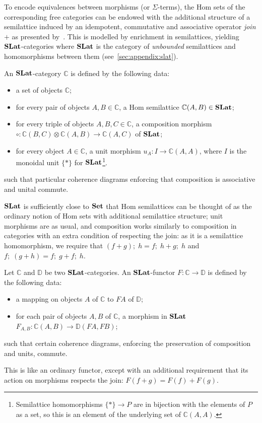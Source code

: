 To encode equivalences between morphisms (or $\Sigma$-terms), the Hom sets of the corresponding free categories can be endowed with the additional structure of a semilattice induced by an idempotent, commutative and associative operator \textit{join} $+$ as presented by~\citet{tiurin2025equivalencehypergraphsdporewriting}.
This is modelled by enrichment in semilattices, yielding $\mathbf{SLat}$-categories where $\mathbf{SLat}$ is the category of \textit{unbounded} semilattices and homomorphisms between them (see~\autoref{sec:appendix:slat}).

\begin{defi}%
	\label{def:slat-cat}
	An $\mathbf{SLat}$-category $\mathbb{C}$ is defined by the following data:
	\begin{itemize}
		\item a set of objects $\mathbb{C}$;
		\item for every pair of objects $A,B \in \mathbb{C}$, a Hom semilattice $\mathbb{C}(A,B) \in \mathbf{SLat}$;
		\item for every triple of objects $A,B,C \in \mathbb{C}$, a composition morphism
		      $\circ\colon \mathbb{C}(B,C) \otimes \mathbb{C}(A,B) \to \mathbb{C}(A,C)$ of $\mathbf{SLat}$;
		\item for every object $A \in \mathbb{C}$, a unit morphism
		      $u_{A}\colon I \to \mathbb{C}(A,A)$, where $I$ is the monoidal unit $\{*\}$ for $\mathbf{SLat}$\footnote{Semilattice homomorphisms $\{*\} \to P$ are in bijection with the elements of $P$ as a set, so this is an element of the underlying set of $\mathbb{C}(A,A)$.}.
	\end{itemize}
	such that particular coherence diagrams enforcing that composition is associative and unital commute.
\end{defi}
$\mathbf{SLat}$ is sufficiently close to $\mathbf{Set}$ that Hom semilattices can be thought of as the ordinary notion of Hom sets with additional semilattice structure; unit morphisms are as usual, and composition works similarly to composition in categories with an extra condition of respecting the join: as it is a semilattice homomorphism, we require that $(f + g);\; h = f;\;h + g;\;h$ and $f;\;(g+h) = f;\;g + f;\;h$.

\begin{defi}
	Let $\mathbb{C}$ and $\mathbb{D}$ be two $\mathbf{SLat}$-categories.
	An $\mathbf{SLat}$-functor $F\colon \mathbb{C} \to \mathbb{D}$ is defined by the following data:
	\begin{itemize}
		\item a mapping on objects $A$ of $\mathbb{C}$ to $F A$ of $\mathbb{D}$;
		\item for each pair of objects $A, B$ of $\mathbb{C}$, a morphism in $\mathbf{SLat}$ $F_{A,B}\colon \mathbb{C}(A,B) \to \mathbb{D}(FA,FB)$;
	\end{itemize}
	such that certain coherence diagrams, enforcing the preservation of composition and units, commute.
\end{defi}
This is like an ordinary functor, except with an additional requirement that its action on morphisms respects the join: $F(f + g) = F(f) + F(g)$.

